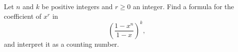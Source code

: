 Let $n$ and $k$ be positive integers and $r\ge0$ an integer. Find a formula for the coefficient of $x^r$ in
\[
\left(\dfrac{1-x^n}{1-x}\right)^k,
\]
and interpret it as a counting number.
